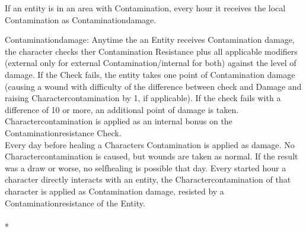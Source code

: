 \documentclass{article}
\begin{document}
    If an entity is in an area with Contamination, every hour it receives the local Contamination
    as Contaminationdamage.\par

    Contaminationdamage: Anytime the an Entity receives Contamination damage, the character checks ther Contamination
    Resistance plus all applicable modifiers (external only for external Contamination/internal for both) against the
    level of damage. If the Check fails, the entity takes one point of Contamination damage (causing a wound with
    difficulty of the difference between check and Damage and raising Charactercontamination by 1, if applicable).
    If the check fails with a difference of 10 or more, an additional point of damage is taken. \\
    Charactercontamination is applied as an internal bonus on the Contaminationresistance Check. \\

    Every day before healing a Characters Contamination is applied as damage. No Charactercontamination is caused,
    but wounds are taken as normal. If the result was a draw or worse, no selfhealing is possible that day.
    Every started hour a character directly interacts with an entity, the Charactercontamination of that character is
    applied as Contamination damage, resisted by a Contaminationresistance of the Entity.\\\\*
\end{document}

